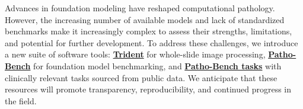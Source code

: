 
\noindent Advances in foundation modeling have reshaped computational pathology. However, the increasing number of available models and lack of standardized benchmarks make it increasingly complex to assess their strengths, limitations, and potential for further development. To address these challenges, we introduce a new suite of software tools: \href{https://github.com/mahmoodlab/trident/}{\textbf{Trident}} for whole-slide image processing, \href{https://github.com/mahmoodlab/patho-bench}{\textbf{Patho-Bench}} for foundation model benchmarking, and \href{https://huggingface.co/datasets/MahmoodLab/Patho-Bench}{\textbf{Patho-Bench tasks}} with clinically relevant tasks sourced from public data. We anticipate that these resources will promote transparency, reproducibility, and continued progress in the field.
